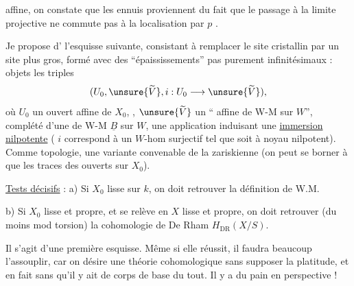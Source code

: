 affine, on constate que les ennuis proviennent du fait que le passage à la limite projective ne commute pas à la localisation par $p$
.

Je propose d' l'esquisse suivante, consistant à remplacer le site cristallin par un site plus gros, formé avec des ``épaississements'' pas purement infinitésimaux : objets les triples
\[
(U_0,\unsure{\widetilde V},i:U_0\longrightarrow\unsure{\widetilde V}),
\]
où $U_0$ un ouvert affine de $X_0$, , $\unsure{\widetilde V}$ un `` affine de W-M sur $W$'',  complété d'une  de W-M $\underline B$ sur $W$,
une  application  induisant une \uline{immersion nilpotente}
( $i$ correspond à un $W$-hom surjectif
tel que
soit à noyau nilpotent).
Comme topologie, une variante convenable de la zariskienne (on peut se borner à  que les traces des ouverts sur $X_0$).

\uline{Tests décisifs} : a) Si $X_0$ lisse  sur $k$, on doit retrouver la définition de W.M.

b) Si $X_0$ lisse et propre, et se relève en $X$ lisse et propre, on doit retrouver (du moins mod torsion) la cohomologie de De Rham $H_{\mathrm{DR}}(X/S)$.

Il s'agit d'une première  esquisse. Même si elle réussit, il faudra beaucoup l'assouplir, car on désire une théorie cohomologique sans supposer la platitude, et en fait sans qu'il y ait de corps de base du tout. Il y a du pain en perspective !

